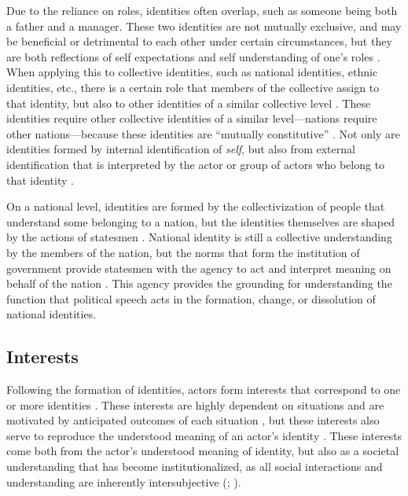 Due to the reliance on roles, identities often overlap, such as someone being both a father and a manager. These two identities are not mutually exclusive, and may be beneficial or detrimental to each other under certain circumstances, but they are both reflections of self expectations and self understanding of one's roles \citep[pg.~397]{wendt1992}. When applying this to collective identities, such as national identities, ethnic identities, etc., there is a certain role that members of the collective assign to that identity, but also to other identities of a similar collective level \citep[pg.~280]{weldes1996}. These identities require other collective identities of a similar level---nations require other nations---because these identities are ``mutually constitutive'' \citep[as cited in \citealt{wendt1992}, pg.~399]{giddens1979}. Not only are identities formed by internal identification of \textit{self}, but also from external identification that is interpreted by the actor or group of actors who belong to that identity \citep[pg.~10-11]{todorova2009}.

On a national level, identities are formed by the collectivization of people that understand some belonging to a nation, but the identities themselves are shaped by the actions of statesmen \citep[pg.~281]{weldes1996}. National identity is still a collective understanding by the members of the nation, but the norms that form the institution of government provide statesmen with the agency to act and interpret meaning on behalf of the nation \citep[pg.~281]{weldes1996}. This agency provides the grounding for understanding the function that political speech acts in the formation, change, or dissolution of national identities.


\subsection{Interests}
\label{subsec:interest}

Following the formation of identities, actors form interests that correspond to one or more identities \citep[pg.~398]{wendt1992}. These interests are highly dependent on situations and are motivated by anticipated outcomes of each situation \citep[pg.~398]{wendt1992}, but these interests also serve to reproduce the understood meaning of an actor's identity \citep[pg.~347]{mitzenOntologicalSecurityWorld2006}. These interests come both from the actor's understood meaning of identity, but also as a societal understanding that has become institutionalized, as all social interactions and understanding are inherently intersubjective (\citealp[pg.~398-399]{wendt1992}; \citealp[pg.~280-281]{weldes1996}).

